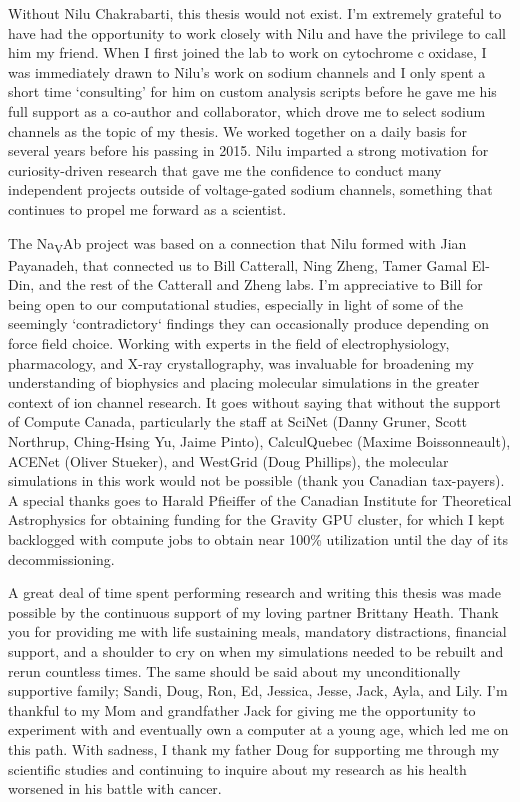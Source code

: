 \documentclass[doublespaced]{ut-thesis}
\begin{document}
\begin{preliminary}
\begin{acknowledgements}
Without Nilu Chakrabarti, this thesis would not exist. I'm extremely grateful to have had the opportunity to work closely with Nilu and have the privilege to call him my friend. When I first joined the lab to work on cytochrome c oxidase, I was immediately drawn to Nilu's work on sodium channels and I only spent a short time `consulting' for him on custom analysis scripts before he gave me his full support as a co-author and collaborator, which drove me to select sodium channels as the topic of my thesis. We worked together on a daily basis for several years before his passing in 2015. Nilu imparted a strong motivation for curiosity-driven research that gave me the confidence to conduct many independent projects outside of voltage-gated sodium channels, something that continues to propel me forward as a scientist.

The Na\textsubscript{V}Ab project was based on a connection that Nilu formed with Jian Payanadeh, that connected us to Bill Catterall, Ning Zheng, Tamer Gamal El-Din, and the rest of the Catterall and Zheng labs. I'm appreciative to Bill for being open to our computational studies, especially in light of some of the seemingly `contradictory` findings they can occasionally produce depending on force field choice. Working with experts in the field of electrophysiology, pharmacology, and X-ray crystallography, was invaluable for broadening my understanding of biophysics and placing molecular simulations in the greater context of ion channel research. It goes without saying that without the support of Compute Canada, particularly the staff at SciNet (Danny Gruner, Scott Northrup, Ching-Hsing Yu, Jaime Pinto), CalculQuebec (Maxime Boissonneault), ACENet (Oliver Stueker), and WestGrid (Doug Phillips), the molecular simulations in this work would not be possible (thank you Canadian tax-payers). A special thanks goes to Harald Pfieiffer of the Canadian Institute for Theoretical Astrophysics for obtaining funding for the Gravity GPU cluster, for which I kept backlogged with compute jobs to obtain near 100\% utilization until the day of its decommissioning.

A great deal of time spent performing research and writing this thesis was made possible by the continuous support of my loving partner Brittany Heath. Thank you for providing me with life sustaining meals, mandatory distractions, financial support, and a shoulder to cry on when my simulations needed to be rebuilt and rerun countless times. The same should be said about my unconditionally supportive family; Sandi, Doug, Ron, Ed, Jessica, Jesse, Jack, Ayla, and Lily. I'm thankful to my Mom and grandfather Jack for giving me the opportunity to experiment with and eventually own a computer at a young age, which led me on this path. With sadness, I thank my father Doug for supporting me through my scientific studies and continuing to inquire about my research as his health worsened in his battle with cancer. 


\end{acknowledgements}
\end{preliminary}
\end{document}

